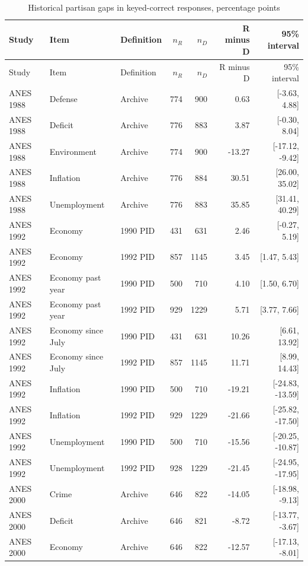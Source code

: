 \begin{longtable}{lllrrrr}
\caption{Historical partisan gaps in keyed-correct responses, percentage points}\label{tab:historicalgaps}\\
\toprule
Study & Item & Definition & $n_R$ & $n_D$ & R minus D & 95\% interval \\
\midrule
\endfirsthead
\toprule
Study & Item & Definition & $n_R$ & $n_D$ & R minus D & 95\% interval \\
\midrule
\endhead
\bottomrule
\endlastfoot
ANES 1988 & Defense & Archive & 774 &  900 & 0.63 & [-3.63, 4.88] \\
ANES 1988 & Deficit & Archive & 776 &  883 & 3.87 & [-0.30, 8.04] \\
ANES 1988 & Environment & Archive & 774 &  900 & -13.27 & [-17.12, -9.42] \\
ANES 1988 & Inflation & Archive & 776 &  884 & 30.51 & [26.00, 35.02] \\
ANES 1988 & Unemployment & Archive & 776 &  883 & 35.85 & [31.41, 40.29] \\
ANES 1992 & Economy & 1990 PID & 431 &  631 & 2.46 & [-0.27, 5.19] \\
ANES 1992 & Economy & 1992 PID & 857 & 1145 & 3.45 & [1.47, 5.43] \\
ANES 1992 & Economy past year & 1990 PID & 500 &  710 & 4.10 & [1.50, 6.70] \\
ANES 1992 & Economy past year & 1992 PID & 929 & 1229 & 5.71 & [3.77, 7.66] \\
ANES 1992 & Economy since July & 1990 PID & 431 &  631 & 10.26 & [6.61, 13.92] \\
ANES 1992 & Economy since July & 1992 PID & 857 & 1145 & 11.71 & [8.99, 14.43] \\
ANES 1992 & Inflation & 1990 PID & 500 &  710 & -19.21 & [-24.83, -13.59] \\
ANES 1992 & Inflation & 1992 PID & 929 & 1229 & -21.66 & [-25.82, -17.50] \\
ANES 1992 & Unemployment & 1990 PID & 500 &  710 & -15.56 & [-20.25, -10.87] \\
ANES 1992 & Unemployment & 1992 PID & 928 & 1229 & -21.45 & [-24.95, -17.95] \\
ANES 2000 & Crime & Archive & 646 &  822 & -14.05 & [-18.98, -9.13] \\
ANES 2000 & Deficit & Archive & 646 &  821 & -8.72 & [-13.77, -3.67] \\
ANES 2000 & Economy & Archive & 646 &  822 & -12.57 & [-17.13, -8.01] \\

\end{longtable}

